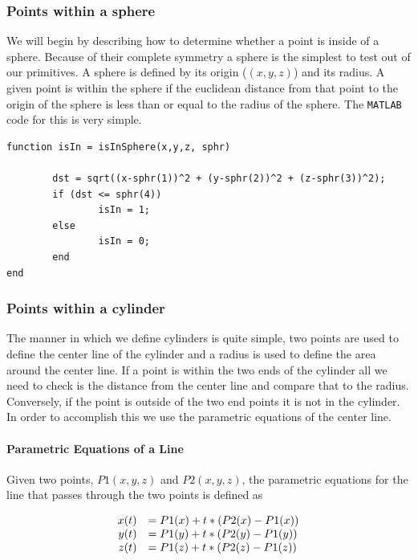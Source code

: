\documentclass[authoryearcitations]{UoYCSproject}
\begin{document}
\subsubsection{Points within a sphere}
We will begin by describing how to determine whether a point is inside of a sphere. Because of their complete
symmetry a sphere is the simplest to test out of our primitives. A sphere is defined by its origin ($(x,y,z)$)
and its radius. A given point is within the sphere if the euclidean distance from that point to the origin of
the sphere is less than or equal to the radius of the sphere. The \verb+MATLAB+ code for this is very simple.

\begin{lstlisting}[caption={Determining if a given point is in a given sphere}, label=lst:sphere]
function isIn = isInSphere(x,y,z, sphr)
	
        dst = sqrt((x-sphr(1))^2 + (y-sphr(2))^2 + (z-sphr(3))^2);
        if (dst <= sphr(4))
                isIn = 1;
        else
                isIn = 0;
        end
end
\end{lstlisting}

\subsubsection{Points within a cylinder}
The manner in which we define cylinders is quite simple, two points are used to define the center line of the
cylinder and a radius is used to define the area around the center line. If a point is within the two ends of the
cylinder all we need to check is the distance from the center line and compare that to the radius. Conversely, if the
point is outside of the two end points it is not in the cylinder. In order to accomplish this we use the parametric
equations of the center line. 

\paragraph{Parametric Equations of a Line}
Given two points, $P1(x,y,z)$ and $P2(x,y,z)$, the parametric equations for the line that passes through the two points
is defined as

\begin{equation}
\begin{array}{r l}
x(t) &= P1(x) + t * (P2(x) - P1(x)) \\
y(t) &= P1(y) + t * (P2(y) - P1(y)) \\
z(t) &= P1(z) + t * (P2(z) - P1(z)) 
\label{eq:paramet}
\end{array}
\end{equation}
\end{document}
